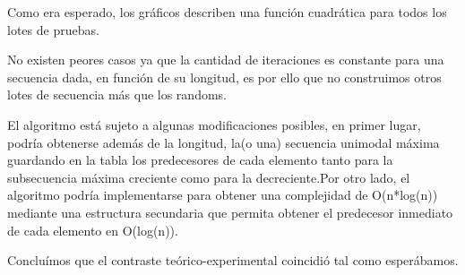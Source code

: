 Como era esperado, los gráficos describen una función cuadrática para todos los lotes de pruebas.

No existen peores casos ya que la cantidad de iteraciones es constante para una secuencia dada, en función de su longitud, es por ello que no construimos otros lotes de secuencia más que los randoms.

El algoritmo está sujeto a algunas modificaciones posibles, en primer lugar, podría obtenerse además de la longitud, la(o una) secuencia unimodal máxima guardando en la tabla los predecesores de cada elemento tanto para la subsecuencia máxima creciente como para la decreciente.Por otro lado, el algoritmo podría implementarse para obtener una complejidad de O(n*log(n)) mediante una estructura secundaria que permita obtener el predecesor inmediato de cada elemento en O(log(n)).

Concluímos que el contraste teórico-experimental coincidió tal como esperábamos. 